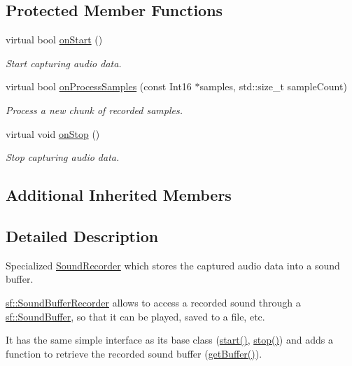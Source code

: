 \subsection*{Protected Member Functions}
\begin{DoxyCompactItemize}
\item 
virtual bool \hyperlink{classsf_1_1SoundBufferRecorder_a531a7445fc8a48eaf9fc039c83f17c6f}{on\-Start} ()
\begin{DoxyCompactList}\small\item\em Start capturing audio data. \end{DoxyCompactList}\item 
virtual bool \hyperlink{classsf_1_1SoundBufferRecorder_a9ceb94de14632ae8c1b78faf603b4767}{on\-Process\-Samples} (const Int16 $\ast$samples, std\-::size\-\_\-t sample\-Count)
\begin{DoxyCompactList}\small\item\em Process a new chunk of recorded samples. \end{DoxyCompactList}\item 
\hypertarget{classsf_1_1SoundBufferRecorder_ab8e53849312413431873a5869d509f1e}{virtual void \hyperlink{classsf_1_1SoundBufferRecorder_ab8e53849312413431873a5869d509f1e}{on\-Stop} ()}\label{classsf_1_1SoundBufferRecorder_ab8e53849312413431873a5869d509f1e}

\begin{DoxyCompactList}\small\item\em Stop capturing audio data. \end{DoxyCompactList}\end{DoxyCompactItemize}
\subsection*{Additional Inherited Members}


\subsection{Detailed Description}
Specialized \hyperlink{classsf_1_1SoundRecorder}{Sound\-Recorder} which stores the captured audio data into a sound buffer. 

\hyperlink{classsf_1_1SoundBufferRecorder}{sf\-::\-Sound\-Buffer\-Recorder} allows to access a recorded sound through a \hyperlink{classsf_1_1SoundBuffer}{sf\-::\-Sound\-Buffer}, so that it can be played, saved to a file, etc.

It has the same simple interface as its base class (\hyperlink{classsf_1_1SoundRecorder_a777e633114f7221cd7554a6ed486259e}{start()}, \hyperlink{classsf_1_1SoundRecorder_a8d9c8346aa9aa409cfed4a1101159c4c}{stop()}) and adds a function to retrieve the recorded sound buffer (\hyperlink{classsf_1_1SoundBufferRecorder_a84fd636ad22f434bafe2a7c15a8e5107}{get\-Buffer()}).

